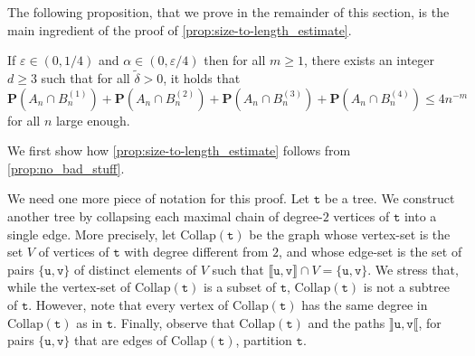 \documentclass[11pt,reqno]{amsart}
\renewcommand{\P}{\mathbf{P}}
\newcommand{\1}{\mathbf{1}}
\newcommand{\0}{\mathbf{0}}
\newcommand{\ttu}{\mathtt{u}}
\newcommand{\ttv}{\mathtt{v}}
\newcommand{\ttt}{\mathtt{t}}
\begin{document}
The following proposition, that we prove in the remainder of this section, is the main ingredient of the proof of \cref{prop:size-to-length_estimate}. 

\begin{prop}
\label{prop:no_bad_stuff}
If $\varepsilon\in (0,1/4)$ and $\alpha\in (0,\varepsilon/4)$ then for all $m\geq 1$, there exists an integer $d\geq 3$ such that for all $\tilde{\delta}>0$, it holds that $\P(A_n\cap B_n^{(1)})+\P(A_n\cap B_n^{(2)})+\P(A_n\cap B_n^{(3)})+\P(A_n\cap B_n^{(4)})\leq 4n^{-m}$ for all $n$ large enough.
\end{prop}


We first show how \cref{prop:size-to-length_estimate} follows from \cref{prop:no_bad_stuff}. 

We need one more piece of notation for this proof. Let $\ttt$ be a tree. We construct another tree by collapsing each maximal chain of degree-$2$ vertices of $\ttt$ into a single edge. More precisely, let $\mathrm{Collap}(\ttt)$ be the graph whose vertex-set is
the set $V$ of vertices of $\ttt$ with degree different from $2$, and whose edge-set is the set of pairs $\{\ttu,\ttv\}$ of distinct elements of $V$ such that $\llbracket\ttu,\ttv\rrbracket\cap V=\{\ttu,\ttv\}$. We stress that, while the vertex-set of $\mathrm{Collap}(\ttt)$ is a subset of $\ttt$, $\mathrm{Collap}(\ttt)$ is not a subtree of $\ttt$. However, note that every vertex of $\mathrm{Collap}(\ttt)$ has the same degree in $\mathrm{Collap}(\ttt)$ as in $\ttt$. Finally, observe that $\mathrm{Collap}(\ttt)$ and the paths $\rrbracket\ttu,\ttv\llbracket$, for pairs $\{\ttu,\ttv\}$ that are edges of $\mathrm{Collap}(\ttt)$, partition $\ttt$. 
\end{document}
